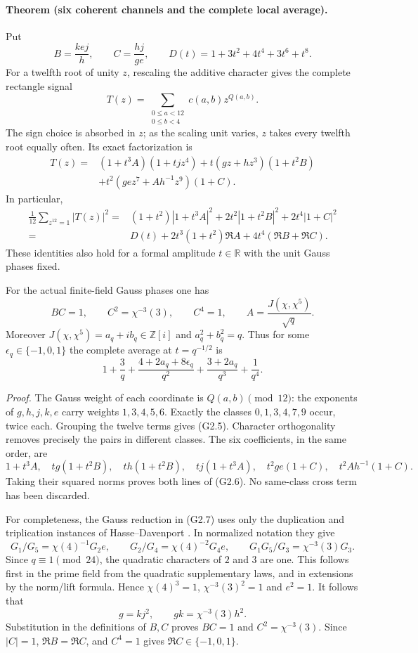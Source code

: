 \documentclass[11pt]{article}
\newcommand{\ZZ}{\mathbb Z}
\begin{document}
\paragraph{Theorem (six coherent channels and the complete local average).}
Put
\[
 B=\frac{kej}{h},\qquad C=\frac{hj}{ge},\qquad
 D(t)=1+3t^2+4t^4+3t^6+t^8.
\]
For a twelfth root of unity $z$, rescaling the additive character
gives the complete rectangle signal
\[
 T(z)=\sum_{\substack{0\le a<12\\0\le b<4}}c(a,b)z^{Q(a,b)}.
\]
The sign choice is absorbed in $z$; as the scaling unit varies, $z$
takes every twelfth root equally often. Its exact factorization is
\[
\begin{split}
 T(z)={}&(1+t^3A)(1+tjz^4)
 +t(gz+hz^3)(1+t^2B)\\
 &+t^2(gez^7+A h^{-1}z^9)(1+C).
\end{split}
 \tag{G2.5}
\]
In particular,
\[
\begin{split}
 \frac1{12}\sum_{z^{12}=1}|T(z)|^2
 ={}&(1+t^2)|1+t^3A|^2
      +2t^2|1+t^2B|^2+2t^4|1+C|^2\\
 ={}&D(t)+2t^3(1+t^2)\Re A+4t^4(\Re B+\Re C).
\end{split}
 \tag{G2.6}
\]
These identities also hold for a formal amplitude $t\in\mathbb R$
with the unit Gauss phases fixed.

For the actual finite-field Gauss phases one has
\[
 BC=1,\qquad C^2=\chi^{-3}(3),\qquad C^4=1,
 \qquad A=\frac{J(\chi,\chi^5)}{\sqrt q}.
 \tag{G2.7}
\]
Moreover $J(\chi,\chi^5)=a_q+ib_q\in\ZZ[i]$ and
$a_q^2+b_q^2=q$. Thus for some $\epsilon_q\in\{-1,0,1\}$
the complete average at $t=q^{-1/2}$ is
\[
 1+\frac3q+\frac{4+2a_q+8\epsilon_q}{q^2}
       +\frac{3+2a_q}{q^3}+\frac1{q^4}.
 \tag{G2.8}
\]

\textit{Proof.}
The Gauss weight of each coordinate is $Q(a,b)\pmod{12}$:
the exponents of $g,h,j,k,e$ carry weights $1,3,4,5,6$.
Exactly the classes $0,1,3,4,7,9$ occur, twice each.
Grouping the twelve terms gives (G2.5). Character orthogonality
removes precisely the pairs in different classes.
The six coefficients, in the same order, are
\[
 1+t^3A,\quad tg(1+t^2B),\quad th(1+t^2B),\quad
 tj(1+t^3A),\quad t^2ge(1+C),\quad t^2A h^{-1}(1+C).
\]
Taking their squared norms proves both lines of (G2.6).
No same-class cross term has been discarded.

For completeness, the Gauss reduction in (G2.7) uses only the
duplication and triplication instances of Hasse--Davenport
\cite[(1.5)--(1.6)]{EvansGreene}. In normalized notation they give
\[
 G_1/G_5=\chi(4)^{-1}G_2e,\qquad
 G_2/G_4=\chi(4)^{-2}G_4e,\qquad
 G_1G_5/G_3=\chi^{-3}(3)G_3.
\]
Since $q\equiv1\pmod{24}$, the quadratic characters of $2$ and $3$
are one. This follows first in the prime field from the quadratic
supplementary laws, and in extensions by the norm/lift formula.
Hence $\chi(4)^3=1$, $\chi^{-3}(3)^2=1$ and $e^2=1$.
It follows that
\[
 g=kj^2,\qquad gk=\chi^{-3}(3)h^2.
\]
Substitution in the definitions of $B,C$ proves $BC=1$ and
$C^2=\chi^{-3}(3)$. Since $|C|=1$, $\Re B=\Re C$,
and $C^4=1$ gives $\Re C\in\{-1,0,1\}$.
\end{document}
